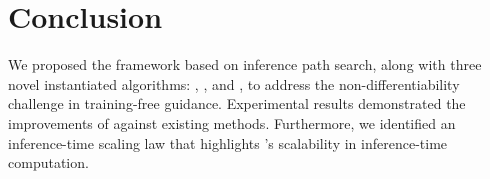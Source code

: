 \section{Conclusion}
We proposed the framework \ouralg based on inference path search, along with three novel instantiated algorithms: \xtsampling, \xcleansampling, and \xtgrad, to address the non-differentiability challenge in training-free guidance. Experimental results demonstrated the improvements of \ouralg against existing methods. Furthermore, we identified an inference-time scaling law that highlights \ouralg's scalability in inference-time computation.